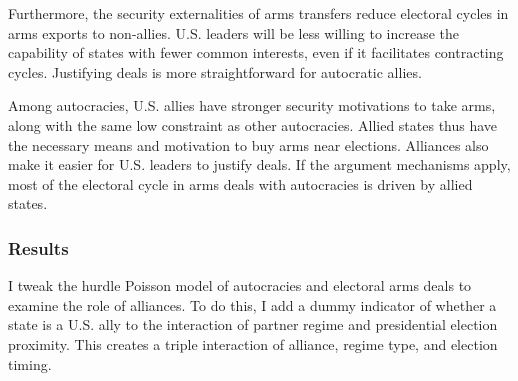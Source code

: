 \documentclass[12pt]{article}
\begin{document}
Furthermore, the security externalities of arms transfers reduce electoral cycles in arms exports to non-allies. 
U.S. leaders will be less willing to increase the capability of states with fewer common interests, even if it facilitates contracting cycles.
Justifying deals is more straightforward for autocratic allies. 







Among autocracies, U.S. allies have stronger security motivations to take arms, along with the same low constraint as other autocracies. 
Allied states thus have the necessary means and motivation to buy arms near elections. 
Alliances also make it easier for U.S. leaders to justify deals.
If the argument mechanisms apply, most of the electoral cycle in arms deals with autocracies is driven by allied states. 
 

 
\subsubsection{Results}

I tweak the hurdle Poisson model of autocracies and electoral arms deals to examine the role of alliances. 
To do this, I add a dummy indicator of whether a state is a U.S. ally to the interaction of partner regime and presidential election proximity. 
This creates a triple interaction of alliance, regime type, and election timing. 
\end{document}
